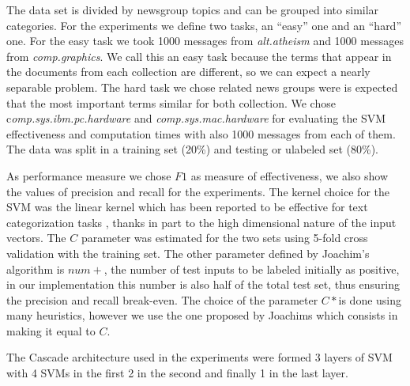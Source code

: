 The data set is divided by newsgroup topics and can
be grouped into similar categories. For the experiments we define
two tasks, an {}``easy'' one and an {}``hard'' one. For the easy
task we took 1000 messages from \emph{alt.atheism }and 1000 messages
from \emph{comp.graphics}. We call this an easy task because the terms
that appear in the documents from each collection are different, so
we can expect a nearly separable problem. The hard task we chose related
news groups were is expected that the most important terms similar
for both collection. We chose c\emph{omp.sys.ibm.pc.hardware} and
\emph{comp.sys.mac.hardware }for evaluating the SVM effectiveness
and computation times with also 1000 messages from each of them. The
data was split in a training set (20\%) and testing or ulabeled set
(80\%). 

As performance measure we chose $F1$ as measure of effectiveness,
we also show the values of precision and recall for the experiments.
The kernel choice for the SVM was the linear kernel which has been
reported to be effective for text categorization tasks \cite{Joachims99c,DumaisPHS98},
thanks in part to the high dimensional nature of the input vectors.
The $C$ parameter was estimated for the two sets using 5-fold cross
validation with the training set. The other parameter defined by Joachim's
algorithm is $num+$, the number of test inputs to be labeled initially
as positive, in our implementation this number is also half of the
total test set, thus ensuring the precision and recall break-even.
The choice of the parameter $C*$is done using many heuristics, however
we use the one proposed by Joachims which consists in making it equal
to $C$. %
%

The Cascade architecture used in the experiments were formed 3 layers
of SVM with 4 SVMs in the first 2 in the second and finally 1 in the
last layer.


